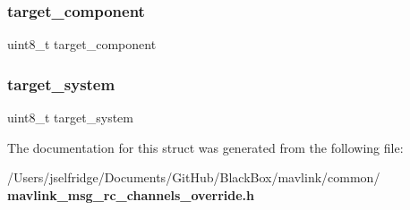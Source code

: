 \subsubsection{target\+\_\+component}
{\footnotesize\ttfamily uint8\+\_\+t target\+\_\+component}

\mbox{\label{struct____mavlink__rc__channels__override__t_ac9afff43526a157e4c4e45607c1418b8}} 
\subsubsection{target\+\_\+system}
{\footnotesize\ttfamily uint8\+\_\+t target\+\_\+system}



The documentation for this struct was generated from the following file\+:\begin{DoxyCompactItemize}
\item 
/\+Users/jselfridge/\+Documents/\+Git\+Hub/\+Black\+Box/mavlink/common/\textbf{ mavlink\+\_\+msg\+\_\+rc\+\_\+channels\+\_\+override.\+h}\end{DoxyCompactItemize}
